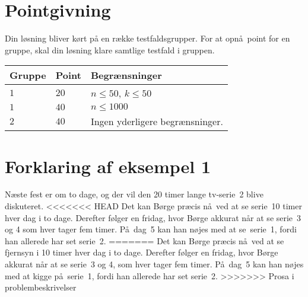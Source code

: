 \section*{Pointgivning}
Din løsning bliver kørt på en række testfaldsgrupper.
For at opnå point for en gruppe, skal din løsning klare samtlige testfald i gruppen.

\noindent
\begin{tabular}{ lll}
Gruppe & Point & Begrænsninger \\ \hline
$1$   & $20$       & $n \leq 50$, $k \leq 50$ \\
$1$   & $40$       & $n \leq 1000$ \\
$2$   & $40$       & Ingen yderligere begrænsninger.
\end{tabular}

\section*{Forklaring af eksempel 1}
Næste fest er om to dage, og der vil den 20 timer lange tv-serie~2 blive diskuteret.
<<<<<<< HEAD
Det kan Børge præcis nå ved at se serie 10 timer hver dag i to dage.
Derefter følger en fridag, hvor Børge akkurat når at se serie~3 og 4 som hver tager fem timer.
På dag~5 kan han nøjes med at se serie~1, fordi han allerede har set serie~2.
=======
Det kan Børge præcis nå ved at se fjernsyn i 10 timer hver dag i to dage.
Derefter følger en fridag, hvor Børge akkurat når at se serie~3 og 4, som hver tager fem timer.
På dag~5 kan han nøjes med at kigge på serie~1, fordi han allerede har set serie~2.
>>>>>>> Prosa i problembeskrivelser
